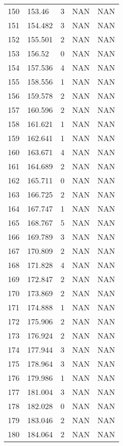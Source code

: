 \documentclass{article}
\begin{document}
\begin{longtable}{@{}lllll@{}}
					150 & 153.46  & 3     & NAN   & NAN   \\
					151 & 154.482 & 3     & NAN   & NAN   \\
					152 & 155.501 & 2     & NAN   & NAN   \\
					153 & 156.52  & 0     & NAN   & NAN   \\
					154 & 157.536 & 4     & NAN   & NAN   \\
					155 & 158.556 & 1     & NAN   & NAN   \\
					156 & 159.578 & 2     & NAN   & NAN   \\
					157 & 160.596 & 2     & NAN   & NAN   \\
					158 & 161.621 & 1     & NAN   & NAN   \\
					159 & 162.641 & 1     & NAN   & NAN   \\
					160 & 163.671 & 4     & NAN   & NAN   \\
					161 & 164.689 & 2     & NAN   & NAN   \\
					162 & 165.711 & 0     & NAN   & NAN   \\
					163 & 166.725 & 2     & NAN   & NAN   \\
					164 & 167.747 & 1     & NAN   & NAN   \\
					165 & 168.767 & 5     & NAN   & NAN   \\
					166 & 169.789 & 3     & NAN   & NAN   \\
					167 & 170.809 & 2     & NAN   & NAN   \\
					168 & 171.828 & 4     & NAN   & NAN   \\
					169 & 172.847 & 2     & NAN   & NAN   \\
					170 & 173.869 & 2     & NAN   & NAN   \\
					171 & 174.888 & 1     & NAN   & NAN   \\
					172 & 175.906 & 2     & NAN   & NAN   \\
					173 & 176.924 & 2     & NAN   & NAN   \\
					174 & 177.944 & 3     & NAN   & NAN   \\
					175 & 178.964 & 3     & NAN   & NAN   \\
					176 & 179.986 & 1     & NAN   & NAN   \\
					177 & 181.004 & 3     & NAN   & NAN   \\
					178 & 182.028 & 0     & NAN   & NAN   \\
					179 & 183.046 & 2     & NAN   & NAN   \\
					180 & 184.064 & 2     & NAN   & NAN   \\

\end{longtable}
\end{document}
